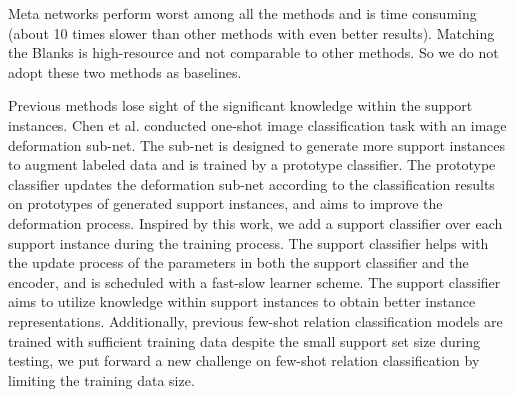 Meta networks perform worst among all the methods \cite{han-etal-2018-fewrel} and
is time consuming (about 10 times slower than other methods with even better results).
Matching the Blanks is high-resource and not comparable to other methods. So we do not adopt these two methods as baselines.

Previous methods lose sight of the significant knowledge within the support instances.
Chen et al.  conducted one-shot image classification task with an image deformation sub-net. The sub-net is designed to generate more support instances to augment labeled data and is trained by a prototype classifier. The prototype classifier updates the deformation sub-net according to the classification results on prototypes of generated support instances, and aims to improve the deformation process.
Inspired by this work, we add a support classifier over each support instance during the training process. The support classifier helps with the update process of the parameters in both the support classifier and the encoder, and is scheduled with a fast-slow learner scheme. The support classifier aims to utilize knowledge within support instances to obtain better instance representations. Additionally, previous few-shot relation classification models are trained with sufficient training data despite the small support set size during testing, %
we put forward a new challenge on few-shot relation classification by limiting the training data size.


